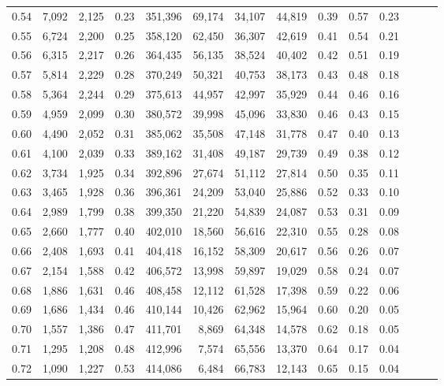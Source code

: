\begin{tabular}{rrrrrrrrrrrrrr}
0.54 &  7,092 &  2,125 &  0.23 &  351,396 &   69,174 &  34,107 &  44,819 &  0.39 &  0.57 &      0.23 \\
0.55 &  6,724 &  2,200 &  0.25 &  358,120 &   62,450 &  36,307 &  42,619 &  0.41 &  0.54 &      0.21 \\
0.56 &  6,315 &  2,217 &  0.26 &  364,435 &   56,135 &  38,524 &  40,402 &  0.42 &  0.51 &      0.19 \\
0.57 &  5,814 &  2,229 &  0.28 &  370,249 &   50,321 &  40,753 &  38,173 &  0.43 &  0.48 &      0.18 \\
0.58 &  5,364 &  2,244 &  0.29 &  375,613 &   44,957 &  42,997 &  35,929 &  0.44 &  0.46 &      0.16 \\
0.59 &  4,959 &  2,099 &  0.30 &  380,572 &   39,998 &  45,096 &  33,830 &  0.46 &  0.43 &      0.15 \\
0.60 &  4,490 &  2,052 &  0.31 &  385,062 &   35,508 &  47,148 &  31,778 &  0.47 &  0.40 &      0.13 \\
0.61 &  4,100 &  2,039 &  0.33 &  389,162 &   31,408 &  49,187 &  29,739 &  0.49 &  0.38 &      0.12 \\
0.62 &  3,734 &  1,925 &  0.34 &  392,896 &   27,674 &  51,112 &  27,814 &  0.50 &  0.35 &      0.11 \\
0.63 &  3,465 &  1,928 &  0.36 &  396,361 &   24,209 &  53,040 &  25,886 &  0.52 &  0.33 &      0.10 \\
0.64 &  2,989 &  1,799 &  0.38 &  399,350 &   21,220 &  54,839 &  24,087 &  0.53 &  0.31 &      0.09 \\
0.65 &  2,660 &  1,777 &  0.40 &  402,010 &   18,560 &  56,616 &  22,310 &  0.55 &  0.28 &      0.08 \\
0.66 &  2,408 &  1,693 &  0.41 &  404,418 &   16,152 &  58,309 &  20,617 &  0.56 &  0.26 &      0.07 \\
0.67 &  2,154 &  1,588 &  0.42 &  406,572 &   13,998 &  59,897 &  19,029 &  0.58 &  0.24 &      0.07 \\
0.68 &  1,886 &  1,631 &  0.46 &  408,458 &   12,112 &  61,528 &  17,398 &  0.59 &  0.22 &      0.06 \\
0.69 &  1,686 &  1,434 &  0.46 &  410,144 &   10,426 &  62,962 &  15,964 &  0.60 &  0.20 &      0.05 \\
0.70 &  1,557 &  1,386 &  0.47 &  411,701 &    8,869 &  64,348 &  14,578 &  0.62 &  0.18 &      0.05 \\
0.71 &  1,295 &  1,208 &  0.48 &  412,996 &    7,574 &  65,556 &  13,370 &  0.64 &  0.17 &      0.04 \\
0.72 &  1,090 &  1,227 &  0.53 &  414,086 &    6,484 &  66,783 &  12,143 &  0.65 &  0.15 &      0.04 \\

\end{tabular}
